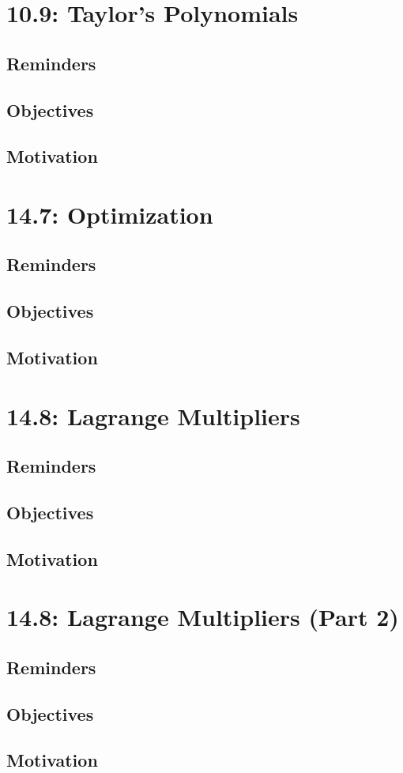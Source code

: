 \documentclass{report}
\begin{document}
\begin{sloppypar}
\chapter{10.9: Taylor's Polynomials}
\section{Reminders}
\section{Objectives}
\section{Motivation}
\chapter{14.7: Optimization}
\section{Reminders}
\section{Objectives}
\section{Motivation}
\chapter{14.8: Lagrange Multipliers}
\section{Reminders}
\section{Objectives}
\section{Motivation}
\chapter{14.8: Lagrange Multipliers (Part 2)}
\section{Reminders}
\section{Objectives}
\section{Motivation}
\end{sloppypar}
\end{document}
